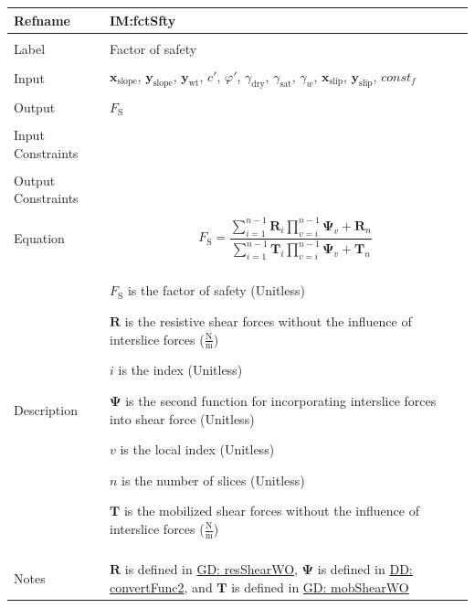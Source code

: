 \documentclass[12pt]{article}
\begin{document}
\vspace{\baselineskip}
\noindent
\begin{minipage}{\textwidth}
\begin{tabular}{>{\raggedright}p{}>{\raggedright\arraybackslash}p{}}
\toprule \textbf{Refname} & \textbf{IM:fctSfty}
\label{IM:fctSfty}
\\ \midrule \\
Label & Factor of safety
        
\\ \midrule \\
Input & ${\mathbf{x}_{\text{slope}}}$, ${\mathbf{y}_{\text{slope}}}$, ${\mathbf{y}_{\text{wt}}}$, $c'$, $φ'$, ${γ_{\text{dry}}}$, ${γ_{\text{sat}}}$, ${γ_{w}}$, ${\mathbf{x}_{\text{slip}}}$, ${\mathbf{y}_{\text{slip}}}$, $const_f$
        
\\ \midrule \\
Output & ${F_{\text{S}}}$
         
\\ \midrule \\
Input Constraints & 
\\ \midrule \\
Output Constraints & 
\\ \midrule \\
Equation & \begin{displaymath}
           {F_{\text{S}}}=\frac{\displaystyle\sum_{i=1}^{n-1}{{\mathbf{R}}_{i} \displaystyle\prod_{v=i}^{n-1}{{\mathbf{Ψ}}_{v}}}+{\mathbf{R}}_{n}}{\displaystyle\sum_{i=1}^{n-1}{{\mathbf{T}}_{i} \displaystyle\prod_{v=i}^{n-1}{{\mathbf{Ψ}}_{v}}}+{\mathbf{T}}_{n}}
           \end{displaymath}
\\ \midrule \\
Description & \begin{symbDescription}
              \item{${F_{\text{S}}}$ is the factor of safety (Unitless)}
              \item{$\mathbf{R}$ is the resistive shear forces without the influence of interslice forces ($\frac{\text{N}}{\text{m}}$)}
              \item{$i$ is the index (Unitless)}
              \item{$\mathbf{Ψ}$ is the second function for incorporating interslice forces into shear force (Unitless)}
              \item{$v$ is the local index (Unitless)}
              \item{$n$ is the number of slices (Unitless)}
              \item{$\mathbf{T}$ is the mobilized shear forces without the influence of interslice forces ($\frac{\text{N}}{\text{m}}$)}
              \end{symbDescription}
\\ \midrule \\
Notes & $\mathbf{R}$ is defined in \hyperref[GD:resShearWO]{GD: resShearWO}, $\mathbf{Ψ}$ is defined in \hyperref[DD:convertFunc2]{DD: convertFunc2}, and $\mathbf{T}$ is defined in \hyperref[GD:mobShearWO]{GD: mobShearWO}
        

\end{tabular}
\end{minipage}
\end{document}
